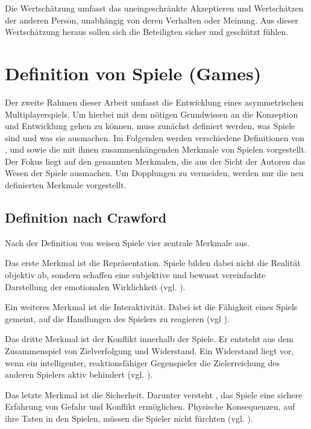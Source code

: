 Die Wertschätzung umfasst das uneingeschränkte Akzeptieren und Wertschätzen der anderen Person, unabhängig von deren Verhalten oder Meinung. Aus dieser Wertschätzung heraus sollen sich die Beteiligten sicher und geschützt fühlen.

\section{Definition von Spiele (Games)}

Der zweite Rahmen dieser Arbeit umfasst die Entwicklung eines asymmetrischen Multiplayerspiels. Um hierbei mit dem nötigen Grundwissen an die Konzeption und Entwicklung gehen zu können, muss zunächst definiert werden, was Spiele sind und was sie ausmachen. Im Folgenden werden verschiedene Definitionen von \citeauthor{crawford_art_1984}, \citeauthor{salen_rules_2003} und \citeauthor{juul_half-real_2005} sowie die mit ihnen zusammenhängenden Merkmale von Spielen vorgestellt. Der Fokus liegt auf den genannten Merkmalen, die aus der Sicht der Autoren das Wesen der Spiele ausmachen. Um Dopplungen zu vermeiden, werden nur die neu definierten Merkmale vorgestellt.

\subsection{Definition nach Crawford}
Nach der Definition von \cite{crawford_art_1984} weisen Spiele vier zentrale Merkmale aus.

Das erste Merkmal ist die Repräsentation. Spiele bilden dabei nicht die Realität objektiv ab, sondern schaffen eine subjektive und bewusst vereinfachte Darstellung der emotionalen Wirklichkeit (vgl. \citealp[S. 4]{crawford_art_1984}).

Ein weiteres Merkmal ist die Interaktivität. Dabei ist die Fähigkeit eines Spiels gemeint, auf die Handlungen des Spielers zu reagieren (vgl \citealp[S. 6ff]{crawford_art_1984}). 

Das dritte Merkmal ist der Konflikt innerhalb der Spiele. Er entsteht aus dem Zusammenspiel von Zielverfolgung und Widerstand. Ein Widerstand liegt vor, wenn ein intelligenter, reaktionsfähiger Gegenspieler die Zielerreichung des anderen Spielers aktiv behindert (vgl. \citealp[S. 11]{crawford_art_1984}). 

Das letzte Merkmal ist die Sicherheit. Darunter versteht \citeauthor{crawford_art_1984}, das Spiele eine sichere Erfahrung von Gefahr und Konflikt ermöglichen. Physische Konsequenzen, auf ihre Taten in den Spielen, müssen die Spieler nicht fürchten (vgl. \citealp[S. 12]{crawford_art_1984}).

